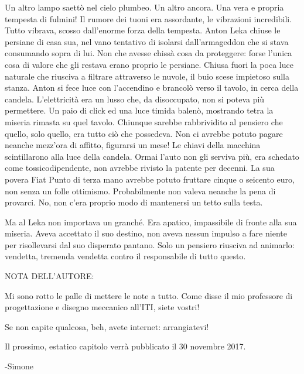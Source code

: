 Un altro lampo saettò nel cielo plumbeo. Un altro ancora. Una vera e propria tempesta di fulmini! Il rumore dei tuoni era assordante, le vibrazioni incredibili. Tutto vibrava, scosso dall'enorme forza della tempesta. Anton Leka chiuse le persiane di casa sua, nel vano tentativo di isolarsi dall'armageddon che si stava consumando sopra di lui. Non che avesse chissà cosa da proteggere: forse l'unica cosa di valore che gli restava erano proprio le persiane. Chiusa fuori la poca luce naturale che riusciva a filtrare attraverso le nuvole, il buio scese impietoso sulla stanza. Anton si fece luce con l'accendino e brancolò verso il tavolo, in cerca della candela. L'elettricità era un lusso che, da disoccupato, non si poteva più permettere. Un paio di click ed una luce timida balenò, mostrando tetra la miseria rimasta su quel tavolo. Chiunque sarebbe rabbrividito al pensiero che quello, solo quello, era tutto ciò che possedeva. Non ci avrebbe potuto pagare neanche mezz'ora di affitto, figurarsi un mese! Le chiavi della macchina scintillarono alla luce della candela. Ormai l'auto non gli serviva più, era schedato come tossicodipendente, non avrebbe rivisto la patente per decenni. La sua povera Fiat Punto di terza mano avrebbe potuto fruttare cinque o seicento euro, non senza un folle ottimismo. Probabilmente non valeva neanche la pena di provarci. No, non c'era proprio modo di mantenersi un tetto sulla testa.

Ma al Leka non importava un granché. Era apatico, impassibile di fronte alla sua miseria. Aveva accettato il suo destino, non aveva nessun impulso a fare niente per risollevarsi dal suo disperato pantano. Solo un pensiero riusciva ad animarlo: vendetta, tremenda vendetta contro il responsabile di tutto questo.

NOTA DELL'AUTORE:

Mi sono rotto le palle di mettere le note a tutto. Come disse il mio professore di progettazione e disegno meccanico all'ITI, siete vostri!

Se non capite qualcosa, beh, avete internet: arrangiatevi!


Il prossimo, estatico capitolo verrà pubblicato il 30 novembre 2017.

-Simone



